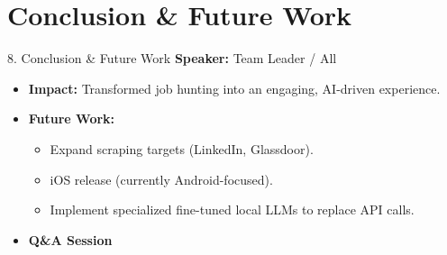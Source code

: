 \documentclass[aspectratio=169]{beamer}
\begin{document}
\section{Conclusion \& Future Work}
\begin{frame}{8. Conclusion \& Future Work}
    \textbf{Speaker:} Team Leader / All
    \vspace{0.5cm}
    \begin{itemize}
        \item \textbf{Impact:} Transformed job hunting into an engaging, AI-driven experience.
        \item \textbf{Future Work:}
        \begin{itemize}
            \item Expand scraping targets (LinkedIn, Glassdoor).
            \item iOS release (currently Android-focused).
            \item Implement specialized fine-tuned local LLMs to replace API calls.
        \end{itemize}
        \item \textbf{Q\&A Session}
    \end{itemize}
\end{frame}
\end{document}

